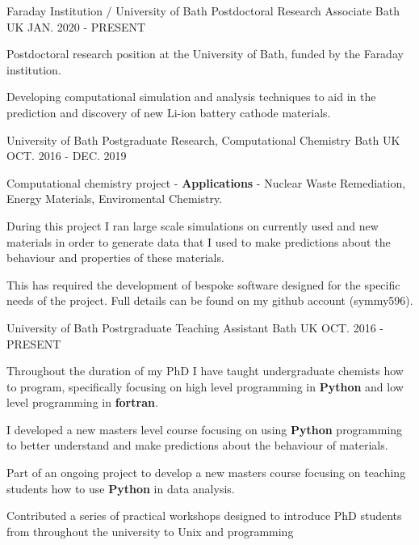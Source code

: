 \begin{cventries}
	\cventry
	{Faraday Institution / University of Bath}
	{Postdoctoral Research Associate}
	{Bath UK}
	{JAN. 2020 - PRESENT}
	{
		\begin{cvitems}
			\item {Postdoctoral research position at the University of Bath, funded by the Faraday institution.}
			\item {Developing computational simulation and analysis techniques to aid in the prediction and discovery of new Li-ion battery cathode materials.}
		\end{cvitems}
	}
	\cventry
	{University of Bath}
	{Postgraduate Research, Computational Chemistry}
	{Bath UK}
	{OCT. 2016 - DEC. 2019}
	{
		\begin{cvitems}
			\item {Computational chemistry project - \textbf{Applications} - Nuclear Waste Remediation, Energy Materials, Enviromental Chemistry.}
			\item {During this project I ran large scale simulations on currently used and new materials in order to generate data that I used to make
			predictions about the behaviour and properties of these materials.}
			\item{This has required the development of bespoke software designed for the specific needs of the project. Full details can be found on
			my github account (symmy596).}
		\end{cvitems}
	}
	\cventry
	{University of Bath}
	{Postrgraduate Teaching Assistant}
	{Bath UK}
	{OCT. 2016 - PRESENT}
	{
		\begin{cvitems}
			\item {Throughout the duration of my PhD I have taught undergraduate chemists how to program, specifically focusing on high level programming
			in \textbf{Python} and low level programming in \textbf{fortran}.}
			\item {I developed a new masters level course focusing on using \textbf{Python} programming to better understand and make predictions about
			the behaviour of materials.}
			\item{Part of an ongoing project to develop a new masters course focusing on teaching students how to use \textbf{Python} in data analysis.}
			\item {Contributed a series of practical workshops designed to introduce PhD students from throughout the university to Unix and programming}
		\end{cvitems}
}
\end{cventries}
